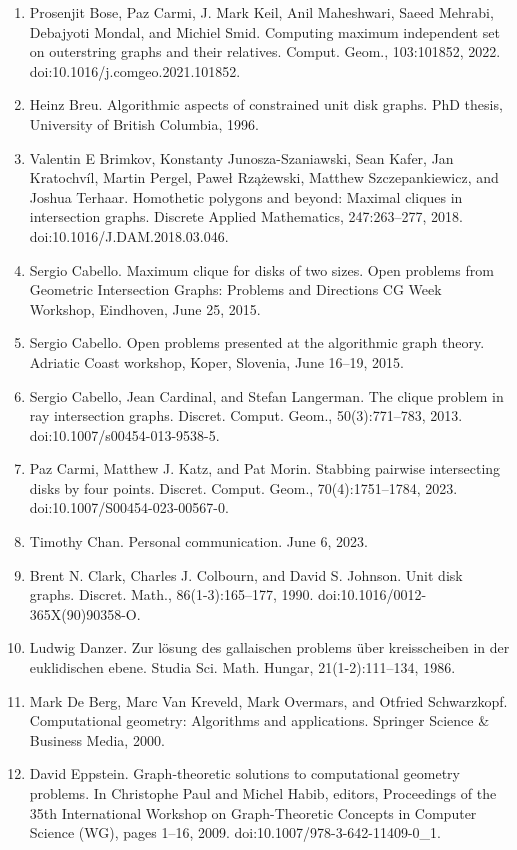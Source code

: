 \documentclass[10pt,a4paper]{amsart}
\begin{document}
\begin{enumerate}
\item[]  [8]  Prosenjit Bose, Paz Carmi, J. Mark Keil, Anil Maheshwari, Saeed Mehrabi, Debajyoti Mondal, and Michiel Smid.  Computing maximum independent set on outerstring graphs and their relatives.  Comput. Geom., 103:101852, 2022.  doi:10.1016/j.comgeo.2021.101852.  
\item[]  [9]  Heinz Breu.  Algorithmic aspects of constrained unit disk graphs.  PhD thesis, University of British Columbia, 1996.  
\item[]  [10]  Valentin E Brimkov, Konstanty Junosza-Szaniawski, Sean Kafer, Jan Kratochvíl, Martin Pergel, Paweł Rzążewski, Matthew Szczepankiewicz, and Joshua Terhaar.  Homothetic polygons and beyond: Maximal cliques in intersection graphs.  Discrete Applied Mathematics, 247:263–277, 2018.  doi:10.1016/J.DAM.2018.03.046.  
\item[]  [11]  Sergio Cabello.  Maximum clique for disks of two sizes.  Open problems from Geometric Intersection Graphs: Problems and Directions CG Week Workshop, Eindhoven, June 25, 2015.  
\item[]  [12]  Sergio Cabello.  Open problems presented at the algorithmic graph theory.  Adriatic Coast workshop, Koper, Slovenia, June 16–19, 2015.  
\item[]  [13]  Sergio Cabello, Jean Cardinal, and Stefan Langerman.  The clique problem in ray intersection graphs.  Discret. Comput. Geom., 50(3):771–783, 2013.  doi:10.1007/s00454-013-9538-5.  
\item[]  [14]  Paz Carmi, Matthew J. Katz, and Pat Morin.  Stabbing pairwise intersecting disks by four points.  Discret. Comput. Geom., 70(4):1751–1784, 2023.  doi:10.1007/S00454-023-00567-0.  
\item[]  [15]  Timothy Chan.  Personal communication.  June 6, 2023.  
\item[]  [16]  Brent N. Clark, Charles J. Colbourn, and David S. Johnson.  Unit disk graphs.  Discret. Math., 86(1-3):165–177, 1990.  doi:10.1016/0012-365X(90)90358-O.  
\item[]  [17]  Ludwig Danzer.  Zur lösung des gallaischen problems über kreisscheiben in der euklidischen ebene.  Studia Sci. Math. Hungar, 21(1-2):111–134, 1986.  
\item[]  [18]  Mark De Berg, Marc Van Kreveld, Mark Overmars, and Otfried Schwarzkopf.  Computational geometry: Algorithms and applications.  Springer Science \& Business Media, 2000.  
\item[]  [19]  David Eppstein.  Graph-theoretic solutions to computational geometry problems.  In Christophe Paul and Michel Habib, editors, Proceedings of the 35th International Workshop on Graph-Theoretic Concepts in Computer Science (WG), pages 1–16, 2009.  doi:10.1007/978-3-642-11409-0\_1.  

\end{enumerate}
\end{document}
